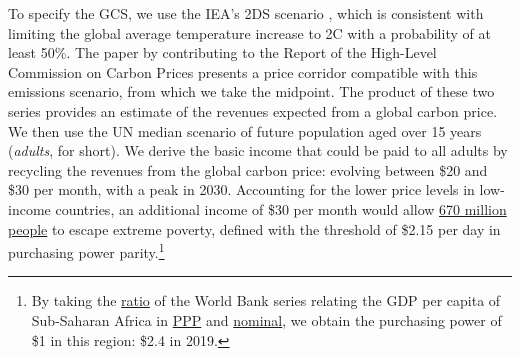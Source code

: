 To specify the GCS, we use the IEA's 2DS scenario \citep{iea_energy_2017}, which is consistent with limiting the global average temperature increase to 2\textdegree{}C with a probability of at least 50\%. The paper by \citet{hood_input_2017} contributing to the Report of the High-Level Commission on Carbon Prices \citep{stern_report_2017} presents a price corridor compatible with this emissions scenario, from which we take the midpoint. The product of these two series provides an estimate of the revenues expected from a global carbon price. We then use the UN median scenario of future population aged over 15 years (\textit{adults}, for short). We derive the basic income that could be paid to all adults by recycling the revenues from the global carbon price: evolving between \$20 and \$30 per month, with a peak in 2030. Accounting for the lower price levels in low-income countries, an additional income of \$30 per month would allow \href{https://data.worldbank.org/indicator/SI.POV.DDAY}{670 million people} to escape extreme poverty, defined with the threshold of \$2.15 per day in purchasing power parity.\footnote{By taking the \href{https://data.worldbank.org/indicator/PA.NUS.PPPC.RF}{ratio} of the World Bank series relating the GDP per capita of Sub-Saharan Africa in \href{https://data.worldbank.org/indicator/NY.GDP.PCAP.PP.KD?locations=ZG&year_high_desc=true}{PPP} and \href{https://data.worldbank.org/indicator/NY.GDP.PCAP.KD?locations=ZG&year_high_desc=true}{nominal}, we obtain the purchasing power of \$1 in this region: \$2.4 in 2019. %
} 

